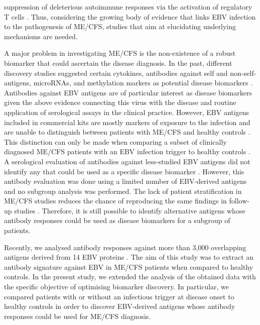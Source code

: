 suppression of deleterious autoimmune responses via the activation of regulatory T cells \citep{sepulveda2019MyalgicEncephalomyelitis}. Thus, considering the growing body of evidence that links EBV infection to the pathogenesis of ME/CFS, studies that aim at elucidating underlying mechanisms are needed.

A major problem in investigating ME/CFS is the non-existence of a robust biomarker that could ascertain the disease diagnosis. In the past, different discovery studies suggested certain cytokines, antibodies against self and non-self-antigens, microRNAs, and methylation markers as potential disease biomarkers \citep{scheibenbogen2017EuropeanME}. Antibodies against EBV antigens are of particular interest as disease biomarkers given the above evidence connecting this virus with the disease and routine application of serological assays in the clinical practice. However, EBV antigens included in commercial kits are mostly markers of exposure to the infection and are unable to distinguish between patients with ME/CFS and healthy controls \citep{cliff2019CellularImmune}. This distinction can only be made when comparing a subset of clinically diagnosed ME/CFS patients with an EBV infection trigger to healthy controls \citep{domingues2021HerpesvirusesSerologya}. A serological evaluation of antibodies against less-studied EBV antigens did not identify any that could be used as a specific disease biomarker \citep{blombergAntibodiesHumanHerpesviruses2019}. However, this antibody evaluation was done using a limited number of EBV-derived antigens and no subgroup analysis was performed. The lack of patient stratification in ME/CFS studies reduces the chance of reproducing the same findings in follow-up studies \citep{jason2005ChronicFatigue, scheibenbogen2017EuropeanME}. Therefore, it is still possible to identify alternative antigens whose antibody responses could be used as disease biomarkers for a subgroup of patients.

Recently, we analysed antibody responses against more than 3,000 overlapping antigens derived from 14 EBV proteins \citep{loebel2017SerologicalProfiling}. The aim of this study was to extract an antibody signature against EBV in ME/CFS patients when compared to healthy controls. In the present study, we extended the analysis of the obtained data with the specific objective of optimising biomarker discovery. In particular, we compared patients with or without an infectious trigger at disease onset to healthy controls in order to discover EBV-derived antigens whose antibody responses could be used for ME/CFS diagnosis.

